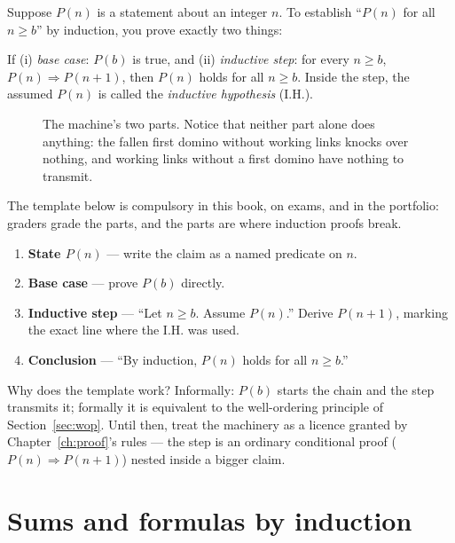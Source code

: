 Suppose $P(n)$ is a statement about an integer $n$. To establish
``$P(n)$ for all $n \ge b$'' by induction, you prove exactly two things:

\begin{definition}
If (i) \emph{base case}: $P(b)$ is true, and (ii) \emph{inductive step}: for
every $n \ge b$, $P(n) \Rightarrow P(n+1)$, then $P(n)$ holds for all $n \ge b$.
Inside the step, the assumed $P(n)$ is called the \emph{inductive
hypothesis} (I.H.).
\end{definition}

\begin{figure}[ht]\centering

\caption{The machine's two parts. Notice that neither part alone does anything:
the fallen first domino without working links knocks over nothing, and working
links without a first domino have nothing to transmit.}
\label{fig:dominoes}
\end{figure}

The template below is compulsory in this book, on exams, and in the portfolio:
graders grade the parts, and the parts are where induction proofs break.

\begin{rulebox}
\begin{enumerate}
\item \textbf{State $P(n)$} --- write the claim as a named predicate on $n$.
\item \textbf{Base case} --- prove $P(b)$ directly.
\item \textbf{Inductive step} --- ``Let $n \ge b$. Assume $P(n)$.'' Derive
$P(n+1)$, marking the exact line where the I.H. was used.
\item \textbf{Conclusion} --- ``By induction, $P(n)$ holds for all $n \ge b$.''
\end{enumerate}
\end{rulebox}

Why does the template work? Informally: $P(b)$ starts the chain and the step
transmits it; formally it is equivalent to the well-ordering principle of
Section~\ref{sec:wop}. Until then, treat the machinery as a licence granted by
Chapter~\ref{ch:proof}'s rules --- the step is an ordinary conditional proof
($P(n) \Rightarrow P(n+1)$) nested inside a bigger claim.

\section{Sums and formulas by induction}\label{sec:suminduct}

